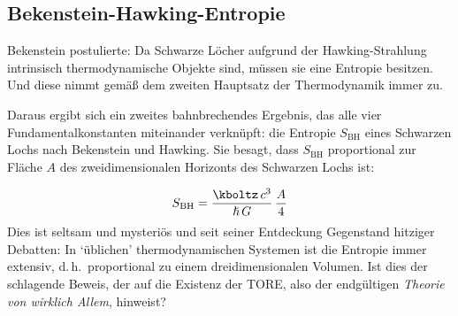 \documentclass{scrartcl}
\begin{document}
\subsection*{Bekenstein-Hawking-Entropie}

Bekenstein postulierte: Da Schwarze Löcher aufgrund der Hawking-Strahlung intrinsisch thermodynamische Objekte sind, müssen sie eine Entropie besitzen. Und diese nimmt gemäß dem zweiten Hauptsatz der Thermodynamik immer zu.

Daraus ergibt sich ein zweites bahnbrechendes Ergebnis, das alle vier Fundamentalkonstanten miteinander verknüpft: die Entropie $S_{\text{BH}}$ eines Schwarzen Lochs nach Bekenstein und Hawking. Sie besagt, dass $S_{\text{BH}}$ proportional zur Fläche $A$ des zweidimensionalen Horizonts des Schwarzen Lochs ist:

\begin{equation*}
  S_{\text{BH}} = \frac{\kboltz\, c^3}{\hslash\, G}\, \frac{A}{4}
\end{equation*}
%
Dies ist seltsam und mysteriös und seit seiner Entdeckung Gegenstand hitziger Debatten: In \enquote*{üblichen} thermodynamischen Systemen ist die Entropie immer extensiv, d.\,h.\ proportional zu einem dreidimensionalen Volumen. Ist dies der schlagende Beweis, der auf die Existenz der TORE, also der endgültigen \emph{Theorie von wirklich Allem}, hinweist?
\end{document}
